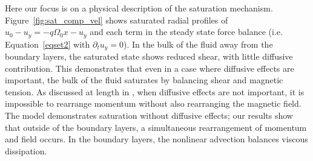 \documentclass[twocolumn]{aastex61}
\begin{document}
Here our focus is on a physical description of the saturation mechanism. Figure~\ref{fig:sat_comp_vel} shows saturated radial profiles of $u_0 - u_{y} = -q \Omega_0 x - u_{y}$ and each term in the steady state force balance (i.e. Equation~\ref{eqset2} with $\partial_t u_{y} = 0$). In the bulk of the fluid away from the boundary layers, the saturated state shows reduced shear, with little diffusive contribution. This demonstrates that even in a case where diffusive effects are important, the bulk of the fluid saturates by balancing shear and magnetic tension. As discussed at length in \citet{Vasil:2015}, when diffusive effects are not important, it is impossible to rearrange momentum without also rearranging the magnetic field. The \citet{Vasil:2015} model demonstrates saturation without diffusive effects; our results show that outside of the boundary layers, a simultaneous rearrangement of momentum and field occurs. In the boundary layers, the nonlinear advection balances viscous dissipation. 
\end{document}
